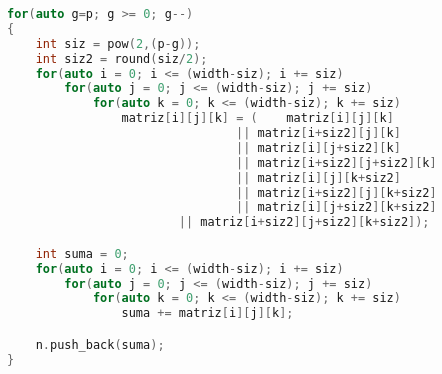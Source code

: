 \begin{lstlisting}[language=C++,caption={Primera versión del Boxcount3D programado en C++},label=CppBox3D]
for(auto g=p; g >= 0; g--)
{
    int siz = pow(2,(p-g));
    int siz2 = round(siz/2);
    for(auto i = 0; i <= (width-siz); i += siz)
        for(auto j = 0; j <= (width-siz); j += siz)
            for(auto k = 0; k <= (width-siz); k += siz)
                matriz[i][j][k] = (    matriz[i][j][k] 
                                || matriz[i+siz2][j][k] 
                                || matriz[i][j+siz2][k] 
                                || matriz[i+siz2][j+siz2][k] 
                                || matriz[i][j][k+siz2] 
                                || matriz[i+siz2][j][k+siz2] 
                                || matriz[i][j+siz2][k+siz2] 
                        || matriz[i+siz2][j+siz2][k+siz2]);

    int suma = 0; 
    for(auto i = 0; i <= (width-siz); i += siz)
        for(auto j = 0; j <= (width-siz); j += siz)
            for(auto k = 0; k <= (width-siz); k += siz)
                suma += matriz[i][j][k];

    n.push_back(suma);
}
\end{lstlisting}

